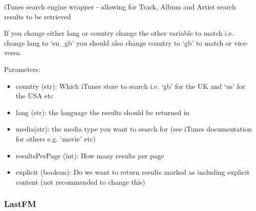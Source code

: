 \documentclass[letterpaper,10pt,english]{sphinxmanual}
\begin{document}
\begin{fulllineitems}
\label{api3.0:puppy.search.engine.ITunes}
iTunes search engine wrapper - allowing for Track, Album and Artist search results to be retrieved

If you change either lang or country change the other variable to match i.e. change lang to `en\_gb' you should also change
country to `gb' to match or vice-versa.

Parameters:
\begin{itemize}
\item {} 
country (str): Which iTunes store to search i.e. `gb' for the UK and `us' for the USA etc

\item {} 
lang (str): the language the results should be returned in

\item {} 
media(str): the media type you want to search for (see iTunes documentation for others e.g. `movie' etc)

\item {} 
resultsPerPage (int): How many results per page

\item {} 
explicit (boolean): Do we want to return results marked as including explicit content (not recommended to change this)

\end{itemize}

\end{fulllineitems}



\subsubsection{LastFM}
\label{api3.0:lastfm}
\end{document}
